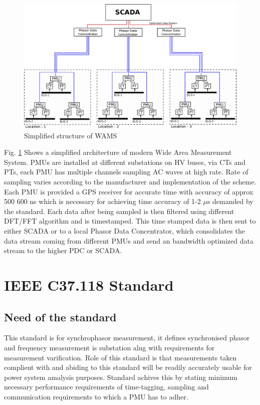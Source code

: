 \begin{figure}
	\includegraphics[width=\textwidth]{fig/wams.eps}
	\caption{Simplified structure of WAMS}
	\label{fig:wams}
\end{figure}

Fig. \ref{fig:wams} Shows a simplified architecture of modern Wide Area Measurement System. PMUs are installed at different substations on HV buses, via CTs and PTs, each PMU has multiple channels sampling AC waves at high rate. Rate of sampling varies according to the manufacturer and implementation of the scheme. Each PMU is provided a GPS receiver for accurate time with accuracy of approx 500 600 ns which is necessary for achieving time accuracy of 1-2 $\mu$s demanded by the standard. Each data after being sampled is then filtered using different DFT/FFT algorithm and is timestamped. This time stamped data is then sent to either SCADA or to a local Phasor Data Concentrator, which consolidates the data stream coming from different PMUs and send an bandwidth optimized data stream to the higher PDC or SCADA. 

\section{IEEE C37.118 Standard}

\subsection{Need of the standard}
This standard is for synchrophasor measurement, it defines synchronised phasor and frequency measurement is substation alng with requirements for measurement varification. Role of this standard is that measurements taken complient with and abiding to this standard will be readily accurately usable for power system amalysis purposes. Standard achives this by stating minimum necessary performance requirements of time-tagging, sampling and communication requirements to which a PMU has to adher.	 

